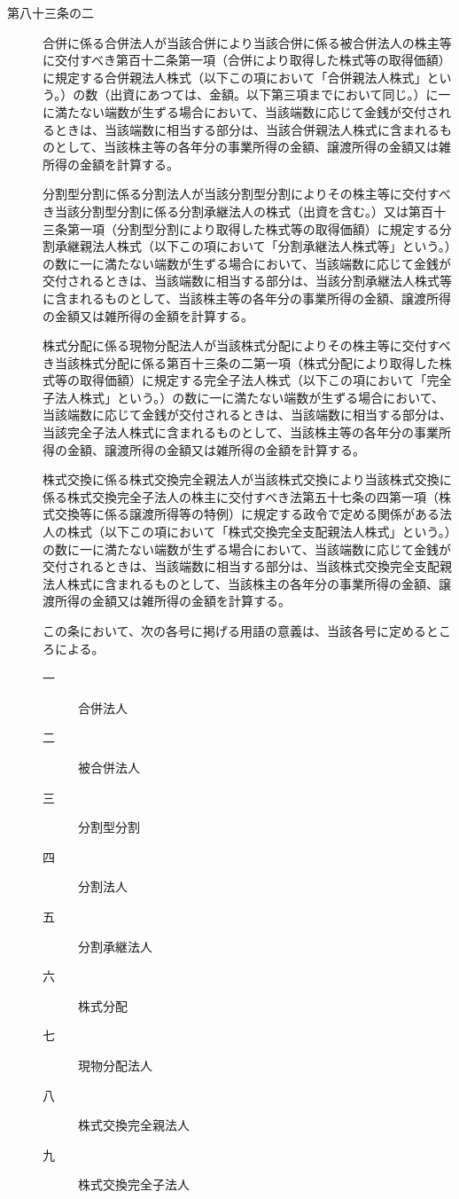\documentclass[twocolumn,a4j,10pt]{ltjtarticle}
\begin{document}
\begin{description}
\item[第八十三条の二]合併に係る合併法人が当該合併により当該合併に係る被合併法人の株主等に交付すべき第百十二条第一項（合併により取得した株式等の取得価額）に規定する合併親法人株式（以下この項において「合併親法人株式」という。）の数（出資にあつては、金額。以下第三項までにおいて同じ。）に一に満たない端数が生ずる場合において、当該端数に応じて金銭が交付されるときは、当該端数に相当する部分は、当該合併親法人株式に含まれるものとして、当該株主等の各年分の事業所得の金額、譲渡所得の金額又は雑所得の金額を計算する。
\item[]分割型分割に係る分割法人が当該分割型分割によりその株主等に交付すべき当該分割型分割に係る分割承継法人の株式（出資を含む。）又は第百十三条第一項（分割型分割により取得した株式等の取得価額）に規定する分割承継親法人株式（以下この項において「分割承継法人株式等」という。）の数に一に満たない端数が生ずる場合において、当該端数に応じて金銭が交付されるときは、当該端数に相当する部分は、当該分割承継法人株式等に含まれるものとして、当該株主等の各年分の事業所得の金額、譲渡所得の金額又は雑所得の金額を計算する。
\item[]株式分配に係る現物分配法人が当該株式分配によりその株主等に交付すべき当該株式分配に係る第百十三条の二第一項（株式分配により取得した株式等の取得価額）に規定する完全子法人株式（以下この項において「完全子法人株式」という。）の数に一に満たない端数が生ずる場合において、当該端数に応じて金銭が交付されるときは、当該端数に相当する部分は、当該完全子法人株式に含まれるものとして、当該株主等の各年分の事業所得の金額、譲渡所得の金額又は雑所得の金額を計算する。
\item[]株式交換に係る株式交換完全親法人が当該株式交換により当該株式交換に係る株式交換完全子法人の株主に交付すべき法第五十七条の四第一項（株式交換等に係る譲渡所得等の特例）に規定する政令で定める関係がある法人の株式（以下この項において「株式交換完全支配親法人株式」という。）の数に一に満たない端数が生ずる場合において、当該端数に応じて金銭が交付されるときは、当該端数に相当する部分は、当該株式交換完全支配親法人株式に含まれるものとして、当該株主の各年分の事業所得の金額、譲渡所得の金額又は雑所得の金額を計算する。
\item[]この条において、次の各号に掲げる用語の意義は、当該各号に定めるところによる。
\begin{description}
\item[一]合併法人
\item[二]被合併法人
\item[三]分割型分割
\item[四]分割法人
\item[五]分割承継法人
\item[六]株式分配
\item[七]現物分配法人
\item[八]株式交換完全親法人
\item[九]株式交換完全子法人
\end{description}
\end{description}
\end{document}
